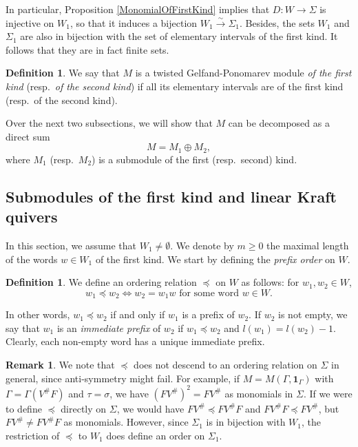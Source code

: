 \documentclass[12pt]{amsart}
\theoremstyle{definition}
\newtheorem{definition}[theorem]{Definition}
\newtheorem{remark}[theorem]{Remark}
\newcommand{\<}{\langle}   %
\renewcommand{\>}{\rangle} %
\begin{document}
In particular, Proposition \ref{MonomialOfFirstKind} implies that $D:W \to \Sigma$ is injective on $W_1$, so that it induces a bijection $W_1 \xrightarrow{\sim} \Sigma_1$. Besides, the sets $W_1$ and $\Sigma_1$ are also in bijection with the set of elementary intervals of the first kind. It follows that they are in fact finite sets. 

\begin{definition}\label{DefinitionTwistedGFModuleOfFirstSecondKind}
    We say that $M$ is a twisted Gelfand-Ponomarev module \textit{of the first kind} (resp.~\textit{of the second kind}) if all its elementary intervals are of the first kind (resp.~of the second kind).
\end{definition}

Over the next two subsections, we will show that $M$ can be decomposed as a direct sum 
\begin{equation*}
    M = M_1 \oplus M_2,
\end{equation*}
where $M_1$ (resp.~$M_2$) is a submodule of the first (resp.~second) kind. 

\subsection{Submodules of the first kind and linear Kraft quivers}

In this section, we assume that $W_1 \not = \emptyset$. We denote by $m \geq 0$ the maximal length of the words $w \in W_1$ of the first kind. We start by defining the \textit{prefix order} on $W$.

\begin{definition}
    We define an ordering relation $\preceq$ on $W$ as follows: for $w_1,w_2 \in W$,
    \begin{equation*}
        w_1 \preceq w_2 \iff w_2 = w_1 w \text{ for some word } w \in W.
    \end{equation*}
\end{definition}

In other words, $w_1 \preceq w_2$ if and only if $w_1$ is a prefix of $w_2$. If $w_2$ is not empty, we say that $w_1$ is an \textit{immediate prefix} of $w_2$ if $w_1 \preceq w_2$ and $l(w_1) = l(w_2) - 1$. Clearly, each non-empty word has a unique immediate prefix.

\begin{remark}
    We note that $\preceq$ does not descend to an ordering relation on $\Sigma$ in general, since anti-symmetry might fail. For example, if $M = M(\Gamma,\mathbf 1_{\Gamma})$ with $\Gamma = \Gamma(V^{\#}F)$ and $\tau = \sigma$, we have $(FV^{\#})^2 = FV^{\#}$ as monomials in $\Sigma$. If we were to define $\preceq$ directly on $\Sigma$, we would have $FV^{\#} \preceq FV^{\#}F$ and $FV^{\#}F \preceq FV^{\#}$, but $FV^{\#} \not = FV^{\#}F$ as monomials. However, since $\Sigma_1$ is in bijection with $W_1$, the restriction of $\preceq$ to $W_1$ does define an order on $\Sigma_1$.
\end{remark}
\end{document}
